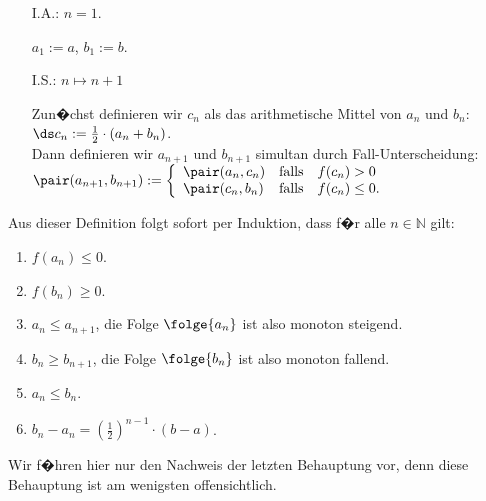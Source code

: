 \begin{enumerate}
\item[I.A.:] $n=1$.

      $a_1 := a$,  \quad $b_1 := b$.
\item[I.S.:] $n \mapsto n+1$

      Zun�chst definieren wir $c_n$ als das arithmetische Mittel von $a_n$ und $b_n$:
      \\[0.2cm]
      \hspace*{1.3cm} $\ds c_n := \frac{1}{2} \cdot (a_n + b_n)$. \\[0.2cm]
      Dann definieren wir $a_{n+1}$ und $b_{n+1}$ simultan durch Fall-Unterscheidung:
      \\[0.2cm]
      \hspace*{1.3cm}
      $\pair(a_{n+1}, b_{n+1}) := \left\{ \begin{array}{ll}
                          \pair(a_n,c_n) & \mbox{falls}\quad f(c_n) >    0 \\
                          \pair(c_n,b_n)   & \mbox{falls}\quad f(c_n) \leq 0. \\
                          \end{array}
                  \right.
      $
\end{enumerate}
Aus dieser Definition folgt sofort per Induktion, dass f�r alle $n\in\mathbb{N}$
gilt:
\begin{enumerate}
\item $f(a_n) \leq 0$.
\item $f(b_n) \geq 0$.
\item $a_n \leq a_{n+1}$, \quad die Folge $\folge{a_n}$ ist also monoton
      steigend.
\item $b_n \geq b_{n+1}$, \quad die Folge $\folge{b_n}$ ist also monoton
      fallend.
\item $a_n \leq b_n$.
\item $\displaystyle b_n - a_n = \left(\frac{1}{2}\right)^{n-1} \cdot (b - a)$.
\end{enumerate}
Wir f�hren hier nur den Nachweis der letzten Behauptung vor, denn diese Behauptung
ist am wenigsten offensichtlich.
